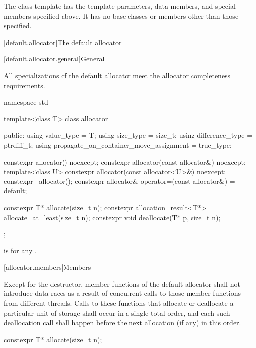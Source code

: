 \pnum
The class template  has
the template parameters, data members, and special members specified above.
It has no base classes or members other than those specified.

[default.allocator]{The default allocator}

[default.allocator.general]{General}

\pnum
All specializations of the default allocator meet the
allocator completeness requirements.

%
%
%
%
%
%
\begin{codeblock}
namespace std {
  template<class T> class allocator {
  public:
    using value_type                             = T;
    using size_type                              = size_t;
    using difference_type                        = ptrdiff_t;
    using propagate_on_container_move_assignment = true_type;

    constexpr allocator() noexcept;
    constexpr allocator(const allocator&) noexcept;
    template<class U> constexpr allocator(const allocator<U>&) noexcept;
    constexpr ~allocator();
    constexpr allocator& operator=(const allocator&) = default;

    constexpr T* allocate(size_t n);
    constexpr allocation_result<T*> allocate_at_least(size_t n);
    constexpr void deallocate(T* p, size_t n);
  };
}
\end{codeblock}

\pnum
{}
is  for any .

[allocator.members]{Members}

\pnum
Except for the destructor, member functions of the default allocator shall not introduce
data races as a result of concurrent calls to those member
functions from different threads. Calls to these functions that allocate or deallocate a
particular unit of storage shall occur in a single total order, and each such
deallocation call shall happen before the next allocation (if any) in this order.

%
\begin{itemdecl}
constexpr T* allocate(size_t n);
\end{itemdecl}

